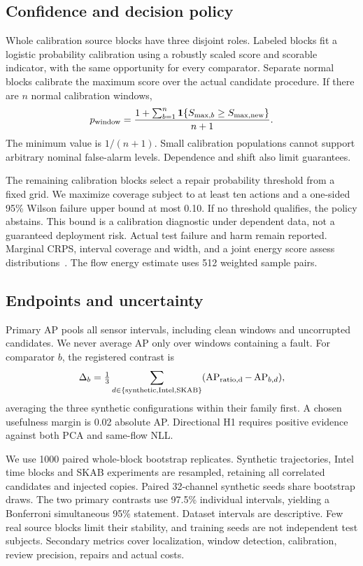 \documentclass[conference]{IEEEtran}
\newcommand{\1}{\mathbf{1}}
\begin{document}
\subsection{Confidence and decision policy}
Whole calibration source blocks have three disjoint roles. Labeled blocks fit a logistic probability calibration using a robustly scaled score and scorable indicator, with the same opportunity for every comparator. Separate normal blocks calibrate the maximum score over the actual candidate procedure. If there are $n$ normal calibration windows,
\[
 p_{\rm window}=\frac{1+\sum_{b=1}^{n}\1\{S_{\max,b}\geq S_{\max,{\rm new}}\}}{n+1}.
\]
The minimum value is $1/(n+1)$. Small calibration populations cannot support arbitrary nominal false-alarm levels. Dependence and shift also limit guarantees.

The remaining calibration blocks select a repair probability threshold from a fixed grid. We maximize coverage subject to at least ten actions and a one-sided 95\% Wilson failure upper bound at most 0.10. If no threshold qualifies, the policy abstains. This bound is a calibration diagnostic under dependent data, not a guaranteed deployment risk. Actual test failure and harm remain reported. Marginal CRPS, interval coverage and width, and a joint energy score assess distributions~\cite{crps}. The flow energy estimate uses 512 weighted sample pairs.

\subsection{Endpoints and uncertainty}
Primary AP pools all sensor intervals, including clean windows and uncorrupted candidates. We never average AP only over windows containing a fault. For comparator $b$, the registered contrast is
\[
 \Delta_b=\tfrac13\sum_{d\in\{\mathrm{synthetic,Intel,SKAB}\}}
       (\operatorname{AP}_{\rm ratio,d}-\operatorname{AP}_{b,d}),
\]
averaging the three synthetic configurations within their family first. A chosen usefulness margin is 0.02 absolute AP. Directional H1 requires positive evidence against both PCA and same-flow NLL.

We use 1000 paired whole-block bootstrap replicates. Synthetic trajectories, Intel time blocks and SKAB experiments are resampled, retaining all correlated candidates and injected copies. Paired 32-channel synthetic seeds share bootstrap draws. The two primary contrasts use 97.5\% individual intervals, yielding a Bonferroni simultaneous 95\% statement. Dataset intervals are descriptive. Few real source blocks limit their stability, and training seeds are not independent test subjects. Secondary metrics cover localization, window detection, calibration, review precision, repairs and actual costs.
\end{document}
